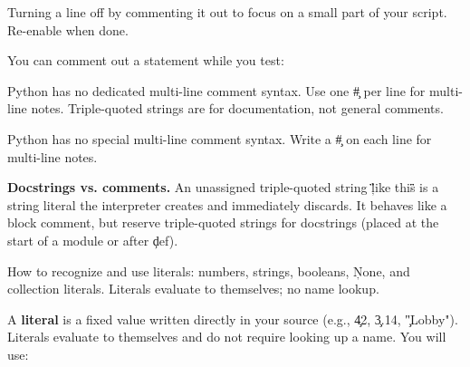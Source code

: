 
Turning a line off by commenting it out to focus on a small part of your script. Re-enable when done.


You can comment out a statement while you test:



Python has no dedicated multi-line comment syntax. Use one \c{#} per line for multi-line notes. Triple-quoted strings are for documentation, not general comments.


Python has no special multi-line comment syntax. Write a \c{#} on each line for multi-line notes.


\begin{NoteBox}
\textbf{Docstrings vs. comments.} An unassigned triple-quoted string \c{\"\"\"like this\"\"\"} is a string literal the interpreter creates and immediately discards. It behaves like a block comment, but reserve triple-quoted strings for docstrings (placed at the start of a module or after \c{def}).
\end{NoteBox}


\noindent How to recognize and use literals: numbers, strings, booleans, \c{None}, and collection literals. Literals evaluate to themselves; no name lookup.


A \textbf{literal} is a fixed value written directly in your source (e.g., \c{42}, \c{3.14}, \c{"Lobby"}). Literals evaluate to themselves and do not require looking up a name. You will use:


